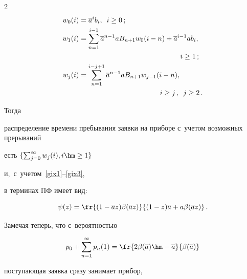 \begin{multicols}{2}
\begin{align}
w_0(i)&= \overline{a}^i b_i, \enskip i \ge 0\,;

\\

w_1(i)&=\sum\limits_{n=1}^{i-1} \overline{a}^{n-1}a B_{n+1} 

w_0(i-n)+\overline{a}^{i-1}a b_i, \notag\\

&\hspace*{50mm}i \ge 1\,; 

\label{gix2}

\\

w_j(i)&=\sum\limits_{n=1}^{i-j+1} \overline{a}^{n-1}a B_{n+1} w_{j-1}(i-n), \notag \\

& \hspace*{40mm}i \ge j\,, \enskip j \ge 2\,. \label{gix3}

\end{align}



\vspace*{-2pt}



\noindent

Тогда

распределение времени пребывания заявки на приборе с~учетом возможных прерываний

есть $\{\sum\nolimits_{j=0}^\infty w_j(i), i \hm\ge 1\}$ 

и,~с~учетом~\eqref{gix1}--\eqref{gix3},

в терминах ПФ имеет вид:

\begin{equation}

\label{ppsi}

\psi(z)=

\fr{( 1- \overline{a} z) \beta(\overline{a} z) }

{(1-z)\overline{a} + a \beta(\overline{a} z)}\,.

\end{equation}

Замечая теперь, что с~вероятностью

$$

p_0+\sum\limits_{n=1}^\infty p_n(1)=

\fr{2\beta(\overline{a})

\hm-\overline{a}}{\beta(\overline{a})}

$$

поступающая заявка сразу занимает прибор,


\end{multicols}
